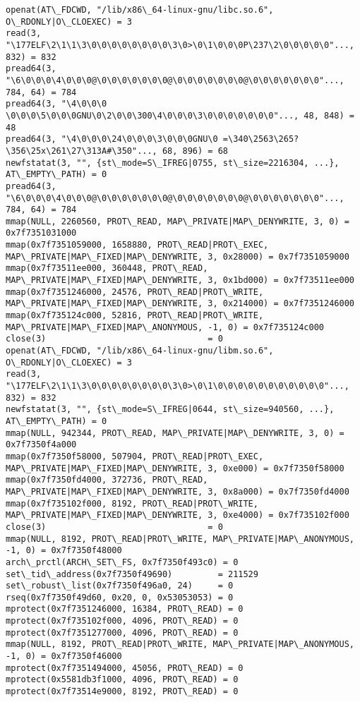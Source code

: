 \documentclass[a4paper, 12pt]{article}
\begin{document}
\begin{lstlisting}
openat(AT\_FDCWD, "/lib/x86\_64-linux-gnu/libc.so.6", O\_RDONLY|O\_CLOEXEC) = 3
read(3, "\177ELF\2\1\1\3\0\0\0\0\0\0\0\0\3\0>\0\1\0\0\0P\237\2\0\0\0\0\0"..., 832) = 832
pread64(3, "\6\0\0\0\4\0\0\0@\0\0\0\0\0\0\0@\0\0\0\0\0\0\0@\0\0\0\0\0\0\0"..., 784, 64) = 784
pread64(3, "\4\0\0\0 \0\0\0\5\0\0\0GNU\0\2\0\0\300\4\0\0\0\3\0\0\0\0\0\0\0"..., 48, 848) = 48
pread64(3, "\4\0\0\0\24\0\0\0\3\0\0\0GNU\0 =\340\2563\265?\356\25x\261\27\313A#\350"..., 68, 896) = 68
newfstatat(3, "", {st\_mode=S\_IFREG|0755, st\_size=2216304, ...}, AT\_EMPTY\_PATH) = 0
pread64(3, "\6\0\0\0\4\0\0\0@\0\0\0\0\0\0\0@\0\0\0\0\0\0\0@\0\0\0\0\0\0\0"..., 784, 64) = 784
mmap(NULL, 2260560, PROT\_READ, MAP\_PRIVATE|MAP\_DENYWRITE, 3, 0) = 0x7f7351031000
mmap(0x7f7351059000, 1658880, PROT\_READ|PROT\_EXEC, MAP\_PRIVATE|MAP\_FIXED|MAP\_DENYWRITE, 3, 0x28000) = 0x7f7351059000
mmap(0x7f73511ee000, 360448, PROT\_READ, MAP\_PRIVATE|MAP\_FIXED|MAP\_DENYWRITE, 3, 0x1bd000) = 0x7f73511ee000
mmap(0x7f7351246000, 24576, PROT\_READ|PROT\_WRITE, MAP\_PRIVATE|MAP\_FIXED|MAP\_DENYWRITE, 3, 0x214000) = 0x7f7351246000
mmap(0x7f735124c000, 52816, PROT\_READ|PROT\_WRITE, MAP\_PRIVATE|MAP\_FIXED|MAP\_ANONYMOUS, -1, 0) = 0x7f735124c000
close(3)                                = 0
openat(AT\_FDCWD, "/lib/x86\_64-linux-gnu/libm.so.6", O\_RDONLY|O\_CLOEXEC) = 3
read(3, "\177ELF\2\1\1\3\0\0\0\0\0\0\0\0\3\0>\0\1\0\0\0\0\0\0\0\0\0\0\0"..., 832) = 832
newfstatat(3, "", {st\_mode=S\_IFREG|0644, st\_size=940560, ...}, AT\_EMPTY\_PATH) = 0
mmap(NULL, 942344, PROT\_READ, MAP\_PRIVATE|MAP\_DENYWRITE, 3, 0) = 0x7f7350f4a000
mmap(0x7f7350f58000, 507904, PROT\_READ|PROT\_EXEC, MAP\_PRIVATE|MAP\_FIXED|MAP\_DENYWRITE, 3, 0xe000) = 0x7f7350f58000
mmap(0x7f7350fd4000, 372736, PROT\_READ, MAP\_PRIVATE|MAP\_FIXED|MAP\_DENYWRITE, 3, 0x8a000) = 0x7f7350fd4000
mmap(0x7f735102f000, 8192, PROT\_READ|PROT\_WRITE, MAP\_PRIVATE|MAP\_FIXED|MAP\_DENYWRITE, 3, 0xe4000) = 0x7f735102f000
close(3)                                = 0
mmap(NULL, 8192, PROT\_READ|PROT\_WRITE, MAP\_PRIVATE|MAP\_ANONYMOUS, -1, 0) = 0x7f7350f48000
arch\_prctl(ARCH\_SET\_FS, 0x7f7350f493c0) = 0
set\_tid\_address(0x7f7350f49690)         = 211529
set\_robust\_list(0x7f7350f496a0, 24)     = 0
rseq(0x7f7350f49d60, 0x20, 0, 0x53053053) = 0
mprotect(0x7f7351246000, 16384, PROT\_READ) = 0
mprotect(0x7f735102f000, 4096, PROT\_READ) = 0
mprotect(0x7f7351277000, 4096, PROT\_READ) = 0
mmap(NULL, 8192, PROT\_READ|PROT\_WRITE, MAP\_PRIVATE|MAP\_ANONYMOUS, -1, 0) = 0x7f7350f46000
mprotect(0x7f7351494000, 45056, PROT\_READ) = 0
mprotect(0x5581db3f1000, 4096, PROT\_READ) = 0
mprotect(0x7f73514e9000, 8192, PROT\_READ) = 0

\end{lstlisting}
\end{document}
